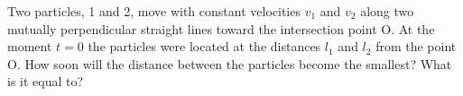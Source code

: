 
\item Two particles, 1 and 2, move with constant velocities \(v_1\) and \(v_2\) along two mutually perpendicular straight lines toward the intersection point O. At the moment \(t = 0\) the particles were located at the distances \(l_1\) and \(l_2\) from the point O. How soon will the distance between the particles become the smallest? What is it equal to?

